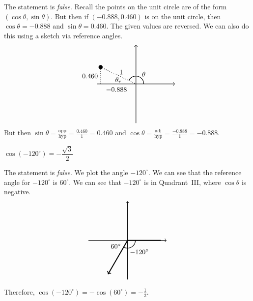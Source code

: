 \documentclass[11pt,letterpaper]{article}
\begin{document}
\sol The statement is \textit{false}. Recall the points on the unit circle are of the form $(\cos \theta, \sin \theta)$. But then if $(-0.888,0.460)$ is on the unit circle, then $\cos \theta= -0.888$ and $\sin \theta= 0.460$. The given values are reversed. We can also do this using a sketch via reference angles. 
	\[
	\begin{tikzpicture}
	\draw[line width=0.03cm,->] (-2,0) -- (2,0);				%
	\draw[line width=0.03cm,->] (0,-2) -- (0,2);				%
	
	\draw[fill=black] (-1.80613, 0.859016) circle (0.1);		%
	\draw[line width=0.03cm,dotted] (-1.80613, 0.859016) -- (-1.80613,0);	%
	\draw[line width=0.03cm,dotted] (-1.80613, 0.859016) -- (0,0);			%
	\draw[line width=0.03cm] (0.4,0) arc (0:154.564:0.4); \node at (0.4,0.5) {$\theta$};	%

	\node at (-1,-0.3) {$-0.888$};	%
	\node at (-2.35,0.4) {$0.460$};	%
	\node at (-0.75,0.6) {$1$};		%
	\node at (-0.9,0.2) {$\theta_r$};	%
	\end{tikzpicture}
	\]
But then $\sin \theta= \frac{\text{opp}}{\text{hyp}}= \frac{0.460}{1}= 0.460$ and $\cos \theta= \frac{\text{adj}}{\text{hyp}}= \frac{-0.888}{1}= -0.888$. \pvspace{1.3cm}



 $\cos(-120^\circ)= -\dfrac{\sqrt{3}}{2}$ \pspace

\sol The statement is \textit{false}. We plot the angle $-120^\circ$. We can see that the reference angle for $-120^\circ$ is $60^\circ$. We can see that $-120^\circ$ is in Quadrant~III, where $\cos \theta$ is negative. 
	\[
	\begin{tikzpicture}
	\draw[line width=0.03cm,->] (-2,0) -- (2,0);				%
	\draw[line width=0.03cm,->] (0,-2) -- (0,2);				%
	
	\draw[fill=black,line width=0.05cm] (0,0) -- (1.7,0);		%
	\draw[fill=black,->,line width=0.05cm] (0,0) -- (-1,-1.732);	%
	\draw[line width=0.03cm] (0.4,0) arc (0:-120:0.4);		%
	
	\node at (-0.6,-0.3) {$60^\circ$};	%
	\node at (0.6,-0.6) {$-120^\circ$};	%
	\end{tikzpicture}
	\]

Therefore, $\cos(-120^\circ)= - \cos(60^\circ)= -\frac{1}{2}$. 
\end{document}
